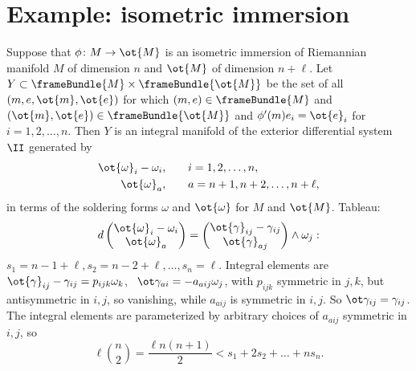 \chapter{Example: isometric immersion}
Suppose that \(\phi \colon M \to \ot{M}\) is an isometric immersion of Riemannian manifold \(M\) of dimension \(n\) and \(\ot{M}\) of dimension \(n+\ell\).
Let \(Y\subset\frameBundle{M}\times\frameBundle{\ot{M}}\) be the set of all \((m,e,\ot{m},\ot{e})\) for which \((m,e) \in \frameBundle{M}\) and \((\ot{m},\ot{e})\in\frameBundle{\ot{M}}\) and \(\phi'(m)e_i=\ot{e}_i\) for \(i=1,2,\dots,n\).
Then \(Y\) is an integral manifold of the exterior differential system \(\II\) generated by
\begin{align*}
\ot{\omega}_i-\omega_i,&\qquad i=1,2,\dots,n, \\
\ot{\omega}_a,&\qquad a=n+1,n+2,\dots,n+\ell,
\end{align*}
in terms of the soldering forms \(\omega\) and \(\ot{\omega}\) for \(M\) and \(\ot{M}\).
Tableau:
\[
d
\begin{pmatrix}
\ot{\omega}_i-\omega_i\\
\ot{\omega}_a
\end{pmatrix}
=
\begin{pmatrix}
\ot{\gamma}_{ij}-\gamma_{ij}\\
\ot{\gamma}_{aj}
\end{pmatrix}
\wedge\omega_j:
\]
\(s_1=n-1+\ell,s_2=n-2+\ell,\dots,s_n=\ell\).
Integral elements are \(\ot{\gamma}_{ij}-\gamma_{ij}=p_{ijk}\omega_k\), \
\(\ot\gamma_{ai}=-a_{aij} \omega_j\), with \(p_{ijk}\) symmetric in \(j,k\), but antisymmetric in \(i,j\), so vanishing, while \(a_{aij}\) is symmetric in \(i,j\).
So \(\ot\gamma_{ij}=\gamma_{ij}\).
The integral elements are parameterized by arbitrary choices of \(a_{aij}\) symmetric in \(i,j\), so 
\[
\ell\binom{n}{2}=\frac{\ell n(n+1)}{2}<
s_1+2s_2+\dots+ns_n.
\]

